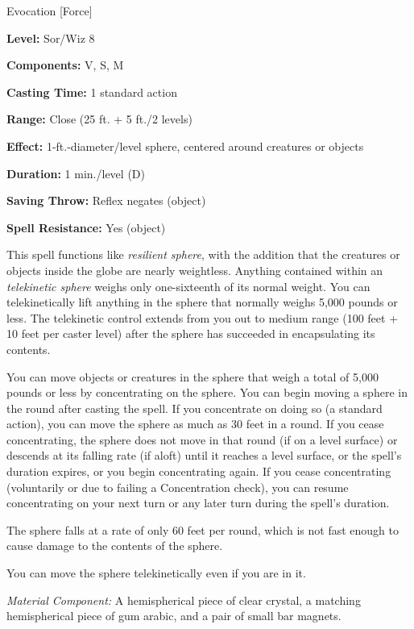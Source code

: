 
Evocation [Force]

\textbf{Level:} Sor/Wiz 8

\textbf{Components:} V, S, M

\textbf{Casting Time:} 1 standard action

\textbf{Range:} Close (25 ft. + 5 ft./2 levels)

\textbf{Effect:} 1-ft.-diameter/level sphere, centered around creatures or objects

\textbf{Duration:} 1 min./level (D)

\textbf{Saving Throw:} Reflex negates (object)

\textbf{Spell Resistance:} Yes (object)

This spell functions like \textit{resilient sphere}, with the addition that the 
creatures or objects inside the globe are nearly weightless. Anything contained 
within an \textit{telekinetic sphere} weighs only one-sixteenth of its normal weight. 
You can telekinetically lift anything in the sphere that normally weighs 5,000 
pounds or less. The telekinetic control extends from you out to medium range (100 
feet + 10 feet per caster level) after the sphere has succeeded in encapsulating 
its contents.

You can move objects or creatures in the sphere that weigh a total of 5,000 pounds 
or less by concentrating on the sphere. You can begin moving a sphere in the round 
after casting the spell. If you concentrate on doing so (a standard action), you 
can move the sphere as much as 30 feet in a round. If you cease concentrating, 
the sphere does not move in that round (if on a level surface) or descends at its 
falling rate (if aloft) until it reaches a level surface, or the spell's duration 
expires, or you begin concentrating again. If you cease concentrating (voluntarily 
or due to failing a Concentration check), you can resume concentrating on your 
next turn or any later turn during the spell's duration.

The sphere falls at a rate of only 60 feet per round, which is not fast enough 
to cause damage to the contents of the sphere.

You can move the sphere telekinetically even if you are in it.

\textit{Material Component:} A hemispherical piece of clear crystal, a matching 
hemispherical piece of gum arabic, and a pair of small bar magnets.

